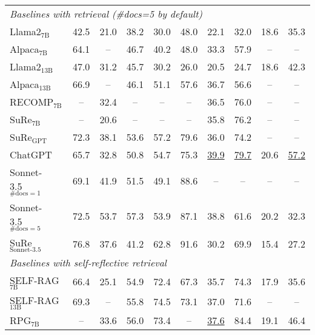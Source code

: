 \begin{table*}[t]
{\begin{tabular}{llccccccccc}
\midrule
\multicolumn{9}{l}{\textit{Baselines with retrieval (\#docs=5 by default)}} \\
Llama2$_{7\text{B}}$ & & 42.5 &21.0 & 38.2 & 30.0 & 48.0   & 22.1 & 32.0 &18.6 &35.3 \\
Alpaca$_{7\text{B}}$ & & 64.1 & -- & 46.7 & 40.2 & 48.0   & 33.3 &57.9 &-- &--\\
Llama2$_{13\text{B}}$ & & 47.0 & 31.2 & 45.7 & 30.2 & 26.0   & 20.5 &24.7 & 18.6 &42.3\\
Alpaca$_{13\text{B}}$ & & 66.9 & -- & 46.1  & 51.1 & 57.6   & 36.7 &56.6 &-- &-- \\
\multicolumn{2}{l}{RECOMP$_{7\text{B}}$ \cite{xu2023recomp}}  &-- &32.4 &-- &-- &-- &36.5 &76.0 &-- &-- \\
\multicolumn{2}{l}{SuRe$_{7\text{B}}$ \cite{kim2024sure}} &-- &20.6 &--  & -- &--  &35.8 &76.2 &-- &--\\
\multicolumn{2}{l}{SuRe$_{\text{GPT}}$} &72.3 &38.1 &53.6  & 57.2 &79.6  &36.0 &74.2 &-- &--\\
ChatGPT & & 65.7 &32.8  & 50.8 & 54.7 & 75.3   & \textcolor{firstclose}{\underline{39.9}} &\textcolor{firstclose}{\underline{79.7}} &20.6 &\textcolor{firstclose}{\underline{57.2}} \\
Sonnet-3.5$_{\#\text{docs}=1}$  &  &69.1 &41.9 &51.5 &49.1 &88.6  &-- &-- &-- &--\\
Sonnet-3.5$_{\#\text{docs}=5}$  &  &72.5 &\textcolor{secondclose}{53.7} &\textcolor{secondclose}{57.3} &53.9 &87.1   &38.8 & 61.6 &20.2 &32.3 \\
\multicolumn{2}{l}{SuRe$_{\text{Sonnet-3.5}}$} &76.8 &37.6 &41.2  &62.8  &\textcolor{secondclose}{91.6}  &30.2 &69.9 &15.4 &27.2\\
\midrule
\multicolumn{9}{l}{\textit{Baselines with self-reflective retrieval}} \\
\multicolumn{2}{l}{SELF-RAG$_{7\text{B}}$ \cite{asai2023self}} & \textcolor{secondopen}{66.4} & 25.1 & 54.9 & 72.4 & \textcolor{secondopen}{67.3}   & 35.7 &74.3 &17.9 &35.6 \\
\multicolumn{2}{l}{SELF-RAG$_{13\text{B}}$} & 69.3 & -- & 55.8 & 74.5 & 73.1   & 37.0 &71.6 &-- &-- \\
\multicolumn{2}{l}{RPG$_{7\text{B}}$ \cite{lyu2024retrieve}} &-- &\textcolor{secondopen}{33.6} & \textcolor{secondopen}{56.0} &\textcolor{secondopen}{73.4} & --  &\textcolor{secondopen}{\underline{37.6}} &\textcolor{firstopen}{84.4} &\textcolor{secondopen}{19.1} & \textcolor{firstopen}{{46.4}} \\

\end{tabular}}
\end{table*}
